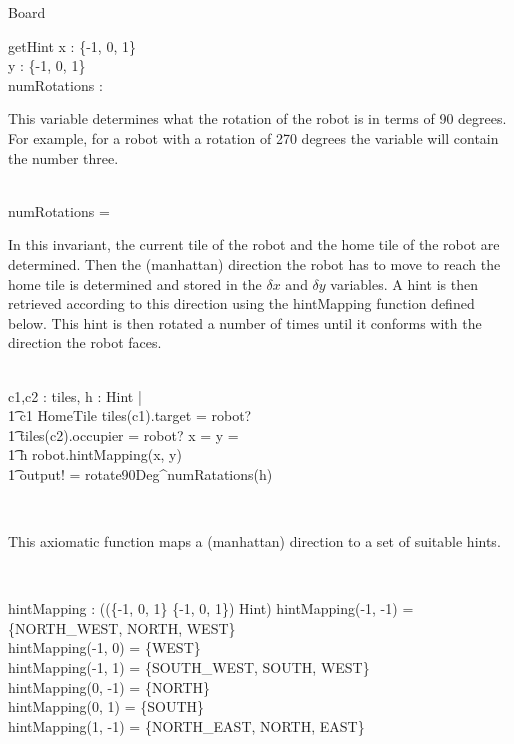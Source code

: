\documentclass[12pt]{article}
\begin{document}
\begin{class}{Board}
\begin{schema}{getHint}
\delta x : \{-1, 0, 1\} \\
\delta y : \{-1, 0, 1\} \\
numRotations : \nat
\where
\begin{zpar}
This variable determines what the rotation of the robot is in terms
of 90 degrees. For example, for a robot with a rotation of 270 degrees
the variable will contain the number three.
\end{zpar} \\
numRotations =  \\
\also \also \also
\begin{zpar}
In this invariant, the current tile of the robot and the home tile of the robot
are determined. Then the (manhattan) direction the robot has to move to reach
the home tile is determined and stored in the $\delta x$ and $\delta y$
variables. A hint is then retrieved according to this direction using the
hintMapping function defined below. This hint is then rotated a number of times
until it conforms with the direction the robot faces.
\end{zpar} \\
\exists c1,c2 : \ran tiles, h : Hint | \\ \t1 c1 \in HomeTile \wedge
 tiles(c1).target = robot? \; \; \wedge \\ \t1 tiles(c2).occupier = robot? \wedge
 \delta x =  \wedge \delta y =  \; \; \wedge \\ \t1
 h \in robot.hintMapping(\delta x, \delta y) \; \; \wedge \\ \t1
 output! = rotate90Deg^{numRatations}(h)
\end{schema} \\
\znewpage
\begin{zpar}
This axiomatic function maps a (manhattan) direction to a set of suitable
hints.
\end{zpar} \\
\begin{axdef}
hintMapping : \power ((\{-1, 0, 1\} \cross \{-1, 0, 1\}) \pfun \power Hint)
\where
hintMapping(-1, -1) = \{NORTH\_WEST, NORTH, WEST\} \\
hintMapping(-1, 0) = \{WEST\} \\
hintMapping(-1, 1) = \{SOUTH\_WEST, SOUTH, WEST\} \\
hintMapping(0, -1) = \{NORTH\} \\
hintMapping(0, 1) = \{SOUTH\} \\
hintMapping(1, -1) = \{NORTH\_EAST, NORTH, EAST\} \\

\end{axdef}
\end{class}
\end{document}
